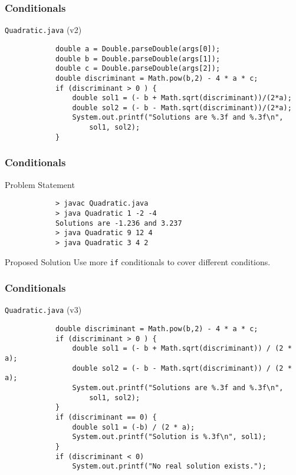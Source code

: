 \documentclass[10pt, compress]{beamer}
\begin{document}
\begin{frame}[fragile]
	\frametitle{Conditionals}
	\begin{block}{\texttt{Quadratic.java} (v2)}
		\begin{verbatim}
			double a = Double.parseDouble(args[0]);
			double b = Double.parseDouble(args[1]);
			double c = Double.parseDouble(args[2]);
			double discriminant = Math.pow(b,2) - 4 * a * c;
			if (discriminant > 0 ) {
			    double sol1 = (- b + Math.sqrt(discriminant))/(2*a);
			    double sol2 = (- b - Math.sqrt(discriminant))/(2*a);
			    System.out.printf("Solutions are %.3f and %.3f\n",
			        sol1, sol2);
			}
		\end{verbatim}
	\end{block}
\end{frame}

\begin{frame}[fragile]
	\frametitle{Conditionals}
	\begin{block}{Problem Statement}
		\begin{verbatim}
			> javac Quadratic.java
			> java Quadratic 1 -2 -4
			Solutions are -1.236 and 3.237
			> java Quadratic 9 12 4
			> java Quadratic 3 4 2
		\end{verbatim}
	\end{block}
	\begin{block}{Proposed Solution}
		Use more \texttt{if} conditionals to cover different conditions.
	\end{block}
\end{frame}

\begin{frame}[fragile]
	\frametitle{Conditionals}
	\begin{block}{\texttt{Quadratic.java} (v3)}
		\begin{verbatim}
			double discriminant = Math.pow(b,2) - 4 * a * c;
			if (discriminant > 0 ) {
			    double sol1 = (- b + Math.sqrt(discriminant)) / (2 * a);
			    double sol2 = (- b - Math.sqrt(discriminant)) / (2 * a);
			    System.out.printf("Solutions are %.3f and %.3f\n",
			        sol1, sol2);
			}
			if (discriminant == 0) {
			    double sol1 = (-b) / (2 * a);
			    System.out.printf("Solution is %.3f\n", sol1);
			}
			if (discriminant < 0)
			    System.out.printf("No real solution exists.");
		\end{verbatim}
	\end{block}
\end{frame}
\end{document}
